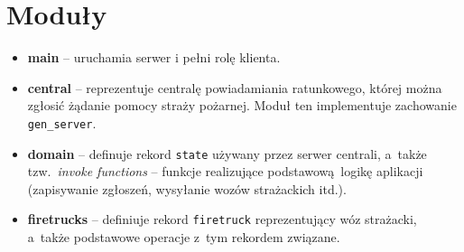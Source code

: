 \documentclass{article}
\begin{document}
\section{Moduły}

\begin{itemize}

	\item \textbf{main} -- uruchamia serwer i pełni rolę klienta.

	\item \textbf{central} -- reprezentuje centralę powiadamiania ratunkowego, której można zgłosić żądanie pomocy straży pożarnej. Moduł ten implementuje zachowanie \texttt{gen\_server}.

	\item \textbf{domain} -- definuje rekord \texttt{state} używany przez serwer centrali, a~także tzw.~\emph{invoke functions} -- funkcje realizujące podstawową logikę aplikacji (zapisywanie zgłoszeń, wysyłanie wozów strażackich itd.).

	\item \textbf{firetrucks} -- definiuje rekord \texttt{firetruck} reprezentujący wóz strażacki, a~także podstawowe operacje z~tym rekordem związane.
\end{itemize}
\end{document}
